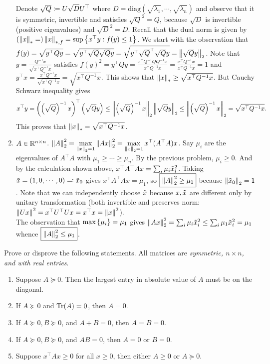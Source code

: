 \begin{enumerate}[leftmargin=*]
Denote $\sqrt{Q}\coloneqq U \sqrt D U^\top$ where $D=\text{diag}(\sqrt{\lambda_1},\cdots,\sqrt{\lambda_n})$ and observe that it is symmetric, invertible and satisfies $\sqrt Q^2 = Q$, because $\sqrt{D}$ is invertible (positive eigenvalues) and $\sqrt D^2=D$.
Recall that the dual norm is given by $\left(\left\lVert x \right\rVert_{*}=\right)\left\lVert x \right\rVert_{*,f} = \sup\left\{x^\top y : f(y)\leq 1\right\}$. We start with the observation that $f(y) = \sqrt{y^\top Q y} = \sqrt{y^\top \sqrt Q \sqrt Q y} = \sqrt{y^\top \sqrt Q^\top \sqrt Q y} = \left\lVert \sqrt Qy \right\rVert_{2}$. 
Note that $y=\frac{Q^{-1}x}{\sqrt{x^\top Q^{-1}x}}$ satisfies $f(y)^2 = y^\top Q y = \frac{x^\top Q^{-1} Q Q^{-1}x}{x^\top Q^{-1}x} = \frac{x^\top Q^{-1}x}{x^\top Q^{-1}x} = 1$ and $y^\top x= \frac{x^\top Q^{-1}x}{\sqrt{x^\top Q^{-1}x}} = \sqrt{x^\top Q^{-1}x}$. This shows that $\left\lVert x \right\rVert_{*} \geq \sqrt{x^\top Q^{-1}x}$. But Cauchy Schwarz inequality gives 
$$x^\top y = \left(\left(\sqrt Q\right)^{-1} x\right)^\top\left(\sqrt Qy\right)\leq \left\lVert \left(\sqrt Q\right)^{-1}x \right\rVert_{2}\left\lVert \sqrt Qy \right\rVert_{2} \leq \left\lVert \left(\sqrt Q\right)^{-1}x \right\rVert_{2}=\sqrt{x^\top Q^{-1}x}.$$ This proves that $\left\lVert x \right\rVert_{*} = \sqrt{x^\top Q^{-1}x}$.

\item $A\in\mathbb{R}^{n\times n}$. $\displaystyle\left\lVert A \right\rVert_{2} ^2 = \max_{\left\lVert x \right\rVert_{2} = 1}\left\lVert Ax \right\rVert_{2}^2 = \max_{\left\lVert x \right\rVert_{2} = 1} x^\top (A^\top A)x$. Say $\mu_i$ are the eigenvalues of $A^\top A$ with $\mu_1\geq\cdots\geq \mu_n$. By the previous problem, $\mu_i\geq 0$. And by the calculation shown above, $x^\top A^\top Ax = \sum_i\mu_i{\tilde{x}}_i^2$. Taking ${\tilde{x}} = (1,0,\cdots,0) \eqqcolon {\tilde{x}}_0$ gives $x^\top A^\top Ax = \mu_1$, so $\boxed{\left\lVert A \right\rVert_{2} ^2 \ge \mu_1}$ because $\left\lVert {\tilde{x}}_0 \right\rVert_{2}=1$. Note that we can independently choose ${\tilde{x}}$ because $x,{\tilde{x}}$ are different only by unitary transformation (both invertible and preserves norm: $\left\lVert Ux \right\rVert_{}^2 = x^\top U^\top U x = x^\top x = \left\lVert x \right\rVert_{}^2$).
\\
The observation that $\max\left\{\mu_i\right\}=\mu_1$ gives $\left\lVert Ax \right\rVert_{2}^2 = \sum_i\mu_i{\tilde{x}}_i^2 \leq \sum_i \mu_1 {\tilde{x}}_i^2 = \mu_1$ whence $\boxed{\left\lVert A \right\rVert_{2} ^2 \leq \mu_1}$.
\end{enumerate}













\newpage
\pb
Prove or disprove the following statements. All matrices are \textit{symmetric, $n \times n$, and with real entries}.
\begin{enumerate}[leftmargin=*]
\item Suppose $A \succeq 0$. Then the largest entry in absolute value of $A$ must be on the diagonal.
\item If $A \succeq 0$ and $\operatorname{Tr}(A) = 0$, then $A = 0$.
\item If $A \succeq 0, B \succeq 0$, and $A + B = 0$, then $A = B = 0$.
\item If $A \succeq 0, B \succeq 0$, and $AB = 0$, then $A = 0$ or $B = 0$.
\item Suppose $x^\top Ax\ge0$ for all $x\ge0$, then either $A\ge0$ or $A\succeq0$. \end{enumerate}
\soln 

